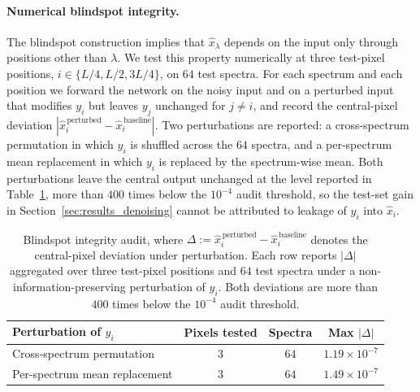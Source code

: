 \documentclass[twocolumn]{aastex7}
\begin{document}
\paragraph{Numerical blindspot integrity.}
The blindspot construction implies that $\hat{x}_{\lambda}$ depends on the input only through positions other than $\lambda$. We test this property numerically at three test-pixel positions, $i\in\{L/4, L/2, 3L/4\}$, on $64$ test spectra. For each spectrum and each position we forward the network on the noisy input and on a perturbed input that modifies $y_{i}$ but leaves $y_{j}$ unchanged for $j\neq i$, and record the central-pixel deviation $|\hat{x}^{\,\mathrm{perturbed}}_{i}-\hat{x}^{\,\mathrm{baseline}}_{i}|$. Two perturbations are reported: a cross-spectrum permutation in which $y_{i}$ is shuffled across the $64$ spectra, and a per-spectrum mean replacement in which $y_{i}$ is replaced by the spectrum-wise mean. Both perturbations leave the central output unchanged at the level reported in Table~\ref{tab:integrity_audit}, more than $400$ times below the $10^{-4}$ audit threshold, so the test-set gain in Section~\ref{sec:results_denoising} cannot be attributed to leakage of $y_{i}$ into $\hat{x}_{i}$.

\begin{table}[ht]
\centering
\small
\caption{Blindspot integrity audit, where $\Delta := \hat{x}^{\,\mathrm{perturbed}}_{i}-\hat{x}^{\,\mathrm{baseline}}_{i}$ denotes the central-pixel deviation under perturbation. Each row reports $|\Delta|$ aggregated over three test-pixel positions and $64$ test spectra under a non-information-preserving perturbation of $y_{i}$. Both deviations are more than $400$ times below the $10^{-4}$ audit threshold.}
\label{tab:integrity_audit}
\begin{tabular}{lccc}
\hline
Perturbation of $y_{i}$ & Pixels tested & Spectra & Max $|\Delta|$ \\
\hline
Cross-spectrum permutation & $3$ & $64$ & $1.19\times10^{-7}$ \\
Per-spectrum mean replacement & $3$ & $64$ & $1.49\times10^{-7}$ \\
\hline
\end{tabular}
\end{table}
\end{document}

